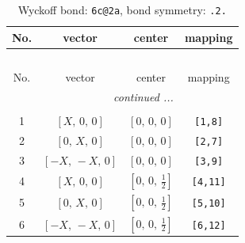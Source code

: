 \documentclass[fleqn,8pt]{jsarticle}
\begin{document}
\begin{longtable}{cccc}
\caption{Wyckoff bond: {\tt 6c@2a}, bond symmetry: {\tt .2.}}
 \\
 \hline \hline
No. & vector & center & mapping \\ \hline \endfirsthead

\multicolumn{3}{l}{\tablename\ \thetable{}} \\
 \hline \hline
No. & vector & center & mapping \\ \hline \endhead

 \hline \hline
\multicolumn{3}{r}{\footnotesize\it continued ...} \\ \endfoot

 \hline \hline
\multicolumn{3}{r}{} \\ \endlastfoot

1 & $\left[ X,\, 0,\, 0 \right]$ & $\left[ 0,\, 0,\, 0 \right]$ & {\tt [1,8]} \\ \hline
2 & $\left[ 0,\, X,\, 0 \right]$ & $\left[ 0,\, 0,\, 0 \right]$ & {\tt [2,7]} \\ \hline
3 & $\left[ - X,\, - X,\, 0 \right]$ & $\left[ 0,\, 0,\, 0 \right]$ & {\tt [3,9]} \\ \hline
4 & $\left[ X,\, 0,\, 0 \right]$ & $\left[ 0,\, 0,\, \frac{1}{2} \right]$ & {\tt [4,11]} \\ \hline
5 & $\left[ 0,\, X,\, 0 \right]$ & $\left[ 0,\, 0,\, \frac{1}{2} \right]$ & {\tt [5,10]} \\ \hline
6 & $\left[ - X,\, - X,\, 0 \right]$ & $\left[ 0,\, 0,\, \frac{1}{2} \right]$ & {\tt [6,12]} \\
\end{longtable}
\renewcommand{\arraystretch}{1.2}
\end{document}
